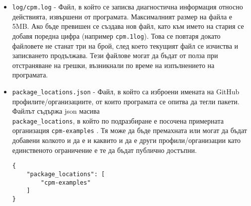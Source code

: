 \begin{itemize}
    \item \texttt{log/cpm.log} - Файл, в който се записва диагностична
          информация относно действията, извършени от програмата. Максималният
          размер на файла е 5MB. Ако бъде превишен се създава нов файл, като
          към името на стария се добавя поредна цифра (например
          \texttt{cpm.1log}). Това се повтаря докато файловете не станат три на
          брой, след което текущият файл се изчиства и записването продължава.
          Тези файлове могат да бъдат от полза при отстраняване на грешки,
          възникнали по време на изпълнението на програмата.
    \item \texttt{package\_locations.json} - Файл, в който са изброени имената
          на GitHub профилите/организациите, от които програмата се опитва да
          тегли пакети. Файлът съдържа json масива \\
          \texttt{package\_locations}, в който по подразбиране е посочена
          примерната организация \texttt{cpm-examples}
          . Тя може да бъде премахната
          или могат да бъдат добавени колкото и да е и каквито и да е други
          профили/организации като единственото ограничение е те да бъдат
          публично достъпни.

\begin{lstlisting}[style=json,
                   caption=package\_locations.json по подразбиране,
                   label={lst:default-package-locations}]
{
    "package_locations": [
        "cpm-examples"
    ]
}
\end{lstlisting}
\end{itemize}
